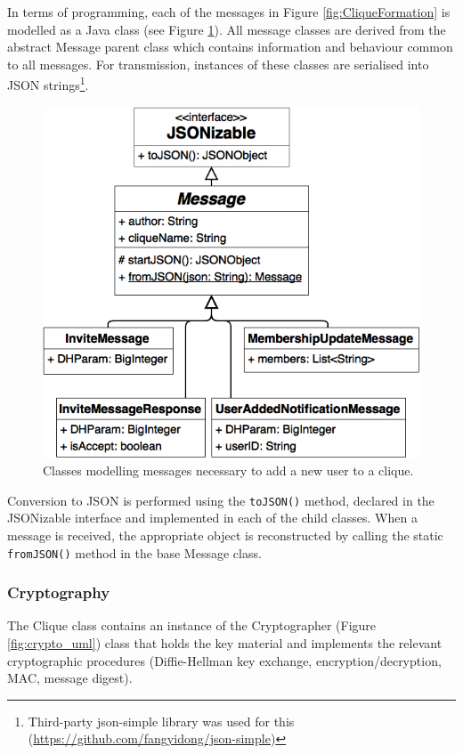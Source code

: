 \documentclass[a4paper, 12pt]{report}
\begin{document}
In terms of programming, each of the messages in Figure \ref{fig:CliqueFormation} is modelled as a Java class (see Figure \ref{fig:messages_uml}). All message classes are derived from the abstract Message parent class which contains information and behaviour common to all messages. For transmission, instances of these classes are serialised into JSON strings\footnote{Third-party json-simple library was used for this (\url{https://github.com/fangyidong/json-simple})}.

\begin{figure}[H]
    \centering
    \includegraphics[width=0.6\linewidth]{pics/messages_uml.png}
    \caption{\label{fig:messages_uml} Classes modelling messages necessary to add a new user to a clique.}
\end{figure}
Conversion to JSON is performed using the \texttt{toJSON()} method, declared in the JSONizable interface and implemented in each of the child classes. When a message is received, the appropriate object is reconstructed by calling the static \texttt{fromJSON()} method in the base Message class. \\

\subsubsection{Cryptography}
The Clique class contains an instance of the Cryptographer (Figure \ref{fig:crypto_uml}) class that holds the key material and implements the relevant cryptographic procedures (Diffie-Hellman key exchange, encryption/decryption, MAC, message digest).
\end{document}
